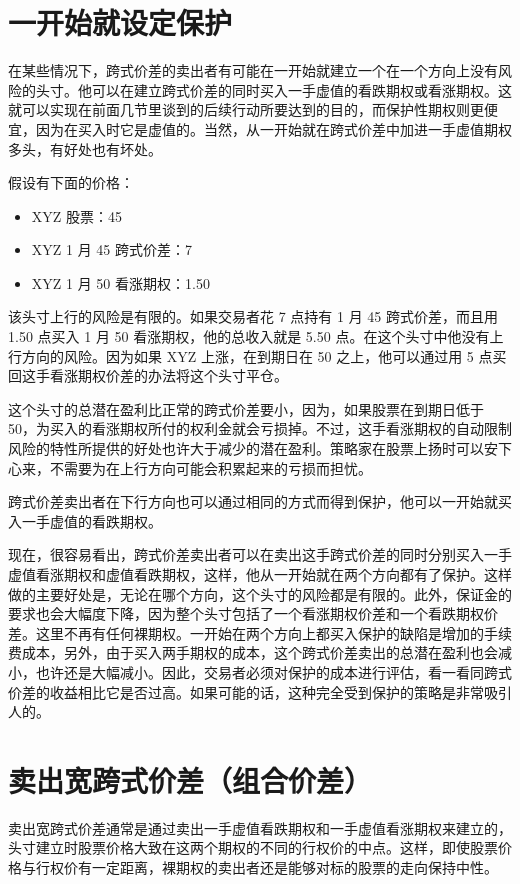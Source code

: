 \section{一开始就设定保护}
在某些情况下，跨式价差的卖出者有可能在一开始就建立一个在一个方向上没有风险的头寸。他可以在建立跨式价差的同时买入一手虚值的看跌期权或看涨期权。这就可以实现在前面几节里谈到的后续行动所要达到的目的，而保护性期权则更便宜，因为在买入时它是虚值的。当然，从一开始就在跨式价差中加进一手虚值期权多头，有好处也有坏处。

\begin{tcolorbox}
    假设有下面的价格：
    \begin{itemize}
        \item XYZ 股票：45
        \item XYZ 1 月 45 跨式价差：7
        \item XYZ 1 月 50 看涨期权：1.50
    \end{itemize}
    该头寸上行的风险是有限的。如果交易者花 7 点持有 1 月 45 跨式价差，而且用 1.50 点买入 1 月 50 看涨期权，他的总收入就是 5.50 点。在这个头寸中他没有上行方向的风险。因为如果 XYZ 上涨，在到期日在 50 之上，他可以通过用 5 点买回这手看涨期权价差的办法将这个头寸平仓。
\end{tcolorbox}

这个头寸的总潜在盈利比正常的跨式价差要小，因为，如果股票在到期日低于 50，为买入的看涨期权所付的权利金就会亏损掉。不过，这手看涨期权的自动限制风险的特性所提供的好处也许大于减少的潜在盈利。策略家在股票上扬时可以安下心来，不需要为在上行方向可能会积累起来的亏损而担忧。

跨式价差卖出者在下行方向也可以通过相同的方式而得到保护，他可以一开始就买入一手虚值的看跌期权。

现在，很容易看出，跨式价差卖出者可以在卖出这手跨式价差的同时分别买入一手虚值看涨期权和虚值看跌期权，这样，他从一开始就在两个方向都有了保护。这样做的主要好处是，无论在哪个方向，这个头寸的风险都是有限的。此外，保证金的要求也会大幅度下降，因为整个头寸包括了一个看涨期权价差和一个看跌期权价差。这里不再有任何裸期权。一开始在两个方向上都买入保护的缺陷是增加的手续费成本，另外，由于买入两手期权的成本，这个跨式价差卖出的总潜在盈利也会减小，也许还是大幅减小。因此，交易者必须对保护的成本进行评估，看一看同跨式价差的收益相比它是否过高。如果可能的话，这种完全受到保护的策略是非常吸引人的。
\section{卖出宽跨式价差（组合价差）}
卖出宽跨式价差通常是通过卖出一手虚值看跌期权和一手虚值看涨期权来建立的，头寸建立时股票价格大致在这两个期权的不同的行权价的中点。这样，即使股票价格与行权价有一定距离，裸期权的卖出者还是能够对标的股票的走向保持中性。

